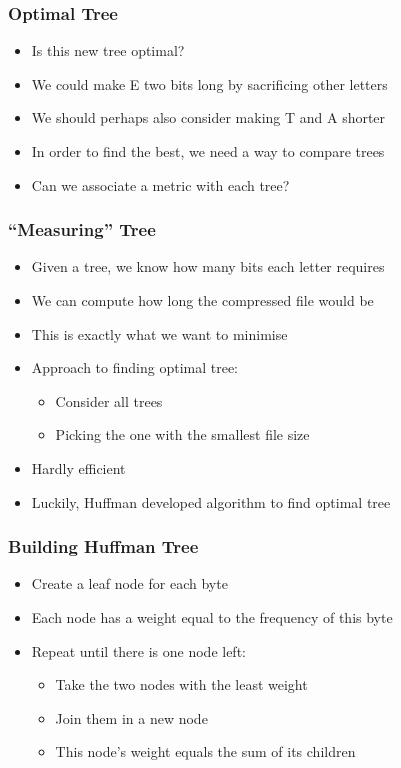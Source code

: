 \begin{frame}
  \frametitle{Optimal Tree}
  \begin{itemize}
    \item Is this new tree optimal?
    \item We could make E two bits long by sacrificing other letters
    \item We should perhaps also consider making T and A shorter
    \item In order to find the best, we need a way to compare trees
    \item Can we associate a metric with each tree?
  \end{itemize}
\end{frame}

\begin{frame}
  \frametitle{``Measuring'' Tree}
  \begin{itemize}
    \item Given a tree, we know how many bits each letter requires
    \item We can compute how long the compressed file would be
    \item This is exactly what we want to minimise
    \item Approach to finding optimal tree:
          \begin{itemize}
            \item Consider all trees
            \item Picking the one with the smallest file size
          \end{itemize}
    \item Hardly efficient
    \item Luckily, Huffman developed algorithm to find optimal tree
  \end{itemize}
\end{frame}

\begin{frame}
  \frametitle{Building Huffman Tree}
  \begin{itemize}
    \item Create a leaf node for each byte
    \item Each node has a weight equal to the frequency of this byte
    \item Repeat until there is one node left:
          \begin{itemize}
            \item Take the two nodes with the least weight
            \item Join them in a new node
            \item This node's weight equals the sum of its children
          \end{itemize}
  \end{itemize}
\end{frame}

